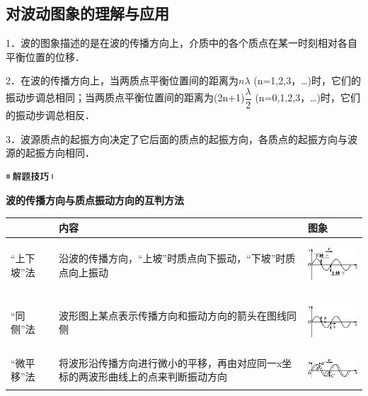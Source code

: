\subsection{对波动图象的理解与应用}

1．波的图象描述的是在波的传播方向上，介质中的各个质点在某一时刻相对各自平衡位置的位移．

2．在波的传播方向上，当两质点平衡位置间的距离为$n\lambda$
(n=1,2,3，\ldots)时，它们的振动步调总相同；当两质点平衡位置间的距离为(2n+1)$\dfrac{\lambda}{2}$
(n=0,1,2,3，\ldots)时，它们的振动步调总相反．

3．波源质点的起振方向决定了它后面的质点的起振方向，各质点的起振方向与波源的起振方向相同．

\begin{center}\includegraphics[width=0.70764in,height=0.12292in]{media/image37.png}\end{center}
\begin{center}
  \textbf{波的传播方向与质点振动方向的互判方法}
\end{center}

\begin{longtable}[]{@{}m{2cm}m{6cm}m{3cm}@{}}
\toprule
& 内容 & 图象\tabularnewline
\midrule
\endhead
``上下坡''法 &
沿波的传播方向，``上坡''时质点向下振动，``下坡''时质点向上振动 &
\includegraphics[width=1.13194in,height=0.73611in]{media/image528.png}\tabularnewline
``同侧''法 & 波形图上某点表示传播方向和振动方向的箭头在图线同侧 &
\includegraphics[width=1.13194in,height=0.73611in]{media/image529.png}\tabularnewline
``微平移''法 &
将波形沿传播方向进行微小的平移，再由对应同一x坐标的两波形曲线上的点来判断振动方向
&
\includegraphics[width=1.18889in,height=0.45278in]{media/image530.png}\tabularnewline
\bottomrule
\end{longtable}


